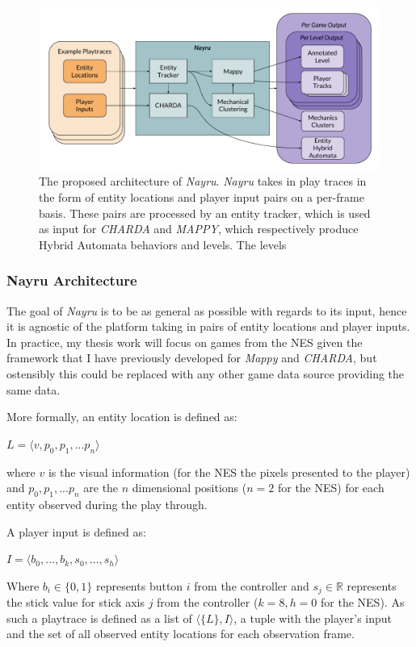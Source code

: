 \documentclass[a4paper]{article}
\begin{document}
\begin{figure}[h]
\centering
\includegraphics[width=1\textwidth]{figures/Nayru_Architecture.pdf}
\caption{The proposed architecture of \textit{Nayru}.  \textit{Nayru} takes in play traces in the form of entity locations and player input pairs on a per-frame basis.  These pairs are processed by an entity tracker, which is used as input for \textit{CHARDA} and \textit{MAPPY}, which respectively produce Hybrid Automata behaviors and levels.  The levels  }
\label{fig:nayru_architecture}
\end{figure}

\subsubsection{Nayru Architecture}
The goal of \textit{Nayru} is to be as general as possible with regards to its input, hence it is agnostic of the platform taking in pairs of entity locations and player inputs.  In practice, my thesis work will focus on games from the NES given the framework that I have previously developed for \textit{Mappy} and \textit{CHARDA}, but ostensibly this could be replaced with any other game data source providing the same data.  

More formally, an entity location is defined as:

$L = \langle v, p_0, p_1, ... p_n \rangle $

where $v$ is the visual information (for the NES the pixels presented to the player) and $p_0, p_1, ... p_n$ are the $n$ dimensional positions ($n = 2$ for the NES) for each entity observed during the play through.  

A player input is defined as:

$I = \langle b_0, ..., b_k , s_0, ..., s_h \rangle$

Where $b_i \in \{0,1\} $ represents button $i$ from the controller and $s_j \in \mathbb{R}$ represents the stick value for stick axis $j$ from the controller ($k = 8, h = 0$ for the NES). As such a playtrace is defined as a list of $\langle \{L\}, I \rangle$, a tuple with the player's input and the set of all observed entity locations for each observation frame.
\end{document}
